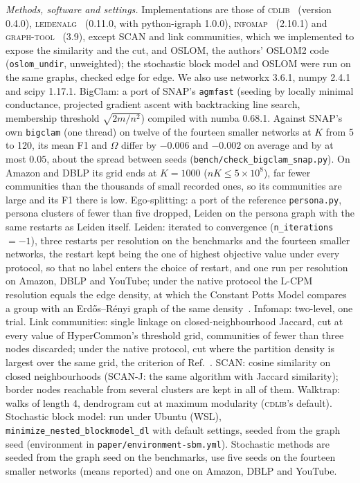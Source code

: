 \emph{Methods, software and settings.} Implementations are those of
\textsc{cdlib}~\cite{rossetti2019cdlib} (version 0.4.0),
\textsc{leidenalg}~\cite{traag_leidenalg} (0.11.0, with python-igraph 1.0.0),
\textsc{infomap}~\cite{edler_infomap} (2.10.1) and
\textsc{graph-tool}~\cite{peixoto_graphtool} (3.9), except SCAN and link communities,
which we implemented to expose the similarity and the cut, and OSLOM, the authors'
OSLOM2 code (\texttt{oslom\_undir}, unweighted); the stochastic block model and OSLOM
were run on the same graphs, checked edge for edge. We also use networkx 3.6.1,
numpy 2.4.1 and scipy 1.17.1. BigClam: a port of SNAP's \texttt{agmfast} (seeding by
locally minimal conductance, projected gradient ascent with backtracking line search,
membership threshold $\sqrt{2m/n^2}$) compiled with numba 0.68.1. Against SNAP's own \texttt{bigclam} (one thread) on twelve of the
fourteen smaller
networks at $K$ from 5 to 120, its mean F1 and $\Omega$ differ by $-0.006$ and $-0.002$ on
average and by at most $0.05$, about the spread between seeds
(\texttt{bench/check\_bigclam\_snap.py}). On Amazon and DBLP its grid ends at $K=1000$
($nK\le5\times10^8$), far fewer communities than the thousands of small recorded ones,
so its communities are large and its F1 there is low. Ego-splitting: a port of
the reference \texttt{persona.py}, persona clusters of fewer than five dropped, Leiden on
the persona graph with the same restarts as Leiden itself. Leiden: iterated to convergence
(\texttt{n\_iterations}$=-1$), three restarts per resolution on the benchmarks and the
fourteen smaller networks, the restart kept being the one of highest objective value
under every protocol, so that no label enters the choice of restart, and one run per
resolution on Amazon, DBLP and YouTube; under the native protocol the L-CPM resolution
equals the edge density, at which the Constant Potts Model compares a group with an
Erd\H{o}s--R\'enyi graph of the same density~\cite{traag2011narrow}. Infomap:
two-level, one trial. Link communities: single linkage on closed-neighbourhood Jaccard,
cut at every value of HyperCommon's threshold grid, communities of fewer than three
nodes discarded; under the native protocol, cut where the partition density is largest
over the same grid, the criterion of Ref.~\cite{ahn2010link}. SCAN: cosine similarity on
closed neighbourhoods (SCAN-J: the same algorithm with Jaccard similarity); border nodes
reachable from several clusters are kept in all of them. Walktrap: walks of length 4,
dendrogram cut at maximum modularity (\textsc{cdlib}'s default). Stochastic block model:
run under Ubuntu (WSL), \texttt{minimize\_nested\_blockmodel\_dl} with default settings,
seeded from the graph seed (environment in \texttt{paper/environment-sbm.yml}).
Stochastic methods are seeded from the graph seed on the benchmarks, use five seeds on
the fourteen smaller networks (means reported) and one on Amazon, DBLP and YouTube.

